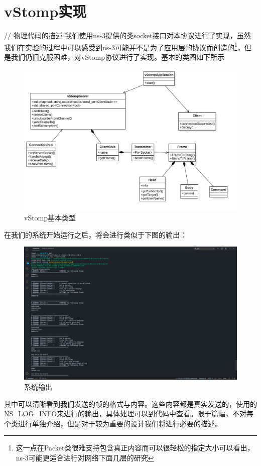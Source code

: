 \documentclass{ctexrep}
\begin{document}
	\chapter{vStomp实现}
	// 物理代码的描述
	我们使用ns-3提供的类socket接口对本协议进行了实现，虽然我们在实验的过程中可以感受到ns-3可能并不是为了应用层的协议而创造的\footnote{这一点在Packet类很难支持包含真正内容而可以很轻松的指定大小可以看出，ns-3可能更适合进行对网络下面几层的研究}，但是我们仍旧克服困难，对vStomp协议进行了实现。基本的类图如下所示\begin{figure}[H]
		\centering
		\includegraphics[width=0.86\linewidth]{img/Main}
		\caption{vStomp基本类型}
		\label{fig:main}
	\end{figure}
	在我们的系统开始运行之后，将会进行类似于下图的输出：\begin{figure}[H]
		\centering
		\includegraphics[width=0.86\linewidth]{img/programOutput}
		\caption{系统输出}
		\label{fig:programoutput}
	\end{figure}其中可以清晰看到我们发送的帧的格式与内容。这些内容都是真实发送的，使用的NS\_LOG\_INFO来进行的输出，具体处理可以到代码中查看。限于篇幅，不对每个类进行单独介绍，但是对于较为重要的设计我们将进行必要的描述。
\end{document}
